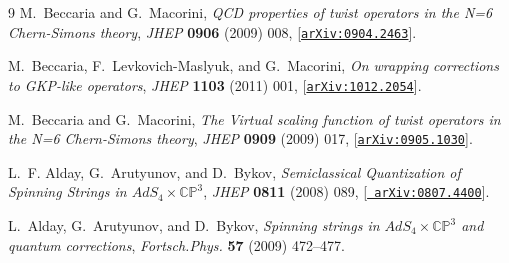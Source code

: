 \documentclass[a4paper,11pt]{article}
\numberwithin{equation}{section}
\begin{document}
\begin{thebibliography} {9}
M.~Beccaria and G.~Macorini, {\it {QCD properties of twist operators in the N=6
  Chern-Simons theory}},  {\em JHEP} {\bf 0906} (2009) 008,
  [\href{http://xxx.lanl.gov/abs/0904.2463}{{\tt arXiv:0904.2463}}].

M.~Beccaria, F.~Levkovich-Maslyuk, and G.~Macorini, {\it {On wrapping
  corrections to GKP-like operators}},  {\em JHEP} {\bf 1103} (2011) 001,
  [\href{http://xxx.lanl.gov/abs/1012.2054}{{\tt arXiv:1012.2054}}].

M.~Beccaria and G.~Macorini, {\it {The Virtual scaling function of twist
  operators in the N=6 Chern-Simons theory}},  {\em JHEP} {\bf 0909} (2009)
  017, [\href{http://xxx.lanl.gov/abs/0905.1030}{{\tt arXiv:0905.1030}}].

L.~F. Alday, G.~Arutyunov, and D.~Bykov, {\it {Semiclassical Quantization of
  Spinning Strings in $AdS_{4}\times \mathbb{CP}^{3}$}},  {\em JHEP} {\bf 0811}
  (2008) 089, [\href{http://xxx.lanl.gov/abs/0807.4400}{{\tt
  arXiv:0807.4400}}].

L.~Alday, G.~Arutyunov, and D.~Bykov, {\it {Spinning strings in $AdS_{4}\times
  \mathbb{CP}^{3}$ and quantum corrections}},  {\em Fortsch.Phys.} {\bf 57}
  (2009) 472--477.

\end{thebibliography}
  
\end{document}
